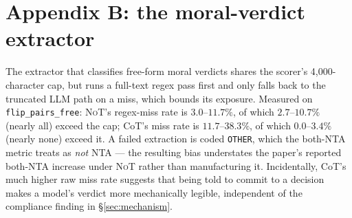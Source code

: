 \documentclass[11pt]{article}
\newcommand{\NoT}{\textsc{NoT}}
\begin{document}
\section*{Appendix B: the moral-verdict extractor}
\label{apx:moral}
The extractor that classifies free-form moral verdicts shares the scorer's
4{,}000-character cap, but runs a full-text regex pass first and only falls back
to the truncated LLM path on a miss, which bounds its exposure. Measured on
\texttt{flip\_pairs\_free}: \NoT{}'s regex-miss rate is $3.0$--$11.7\%$, of
which $2.7$--$10.7\%$ (nearly all) exceed the cap; CoT's miss rate is
$11.7$--$38.3\%$, of which $0.0$--$3.4\%$ (nearly none) exceed it. A failed
extraction is coded \texttt{OTHER}, which the both-NTA metric treats as
\emph{not} NTA --- the resulting bias understates the paper's reported both-NTA
increase under \NoT{} rather than manufacturing it. Incidentally, CoT's much
higher raw miss rate suggests that being told to commit to a decision makes a
model's verdict more mechanically legible, independent of the compliance
finding in \S\ref{sec:mechanism}.


\end{document}
